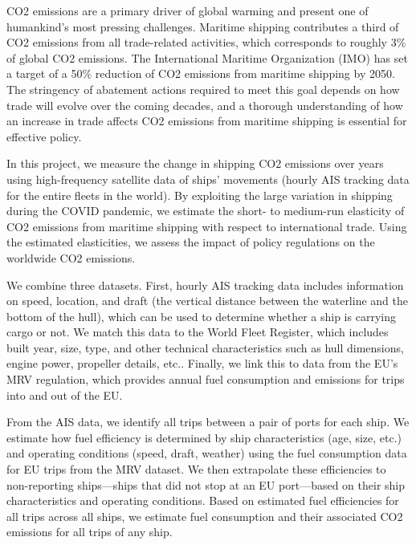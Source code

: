 \documentclass[hidelinks, 12pt,letterpaper]{article}
\begin{document}

 
CO2 emissions are a primary driver of global warming and present one of humankind's most pressing challenges. Maritime shipping contributes a third of CO2 emissions from all trade-related activities, which corresponds to roughly 3\% of global CO2 emissions. The International Maritime Organization (IMO) has set a target of a 50\% reduction of CO2 emissions from maritime shipping by 2050. The stringency of abatement actions required to meet this goal depends on how trade will evolve over the coming decades, and a thorough understanding of how an increase in trade affects CO2 emissions from maritime shipping is essential for effective policy. 

In this project, we measure the change in shipping CO2 emissions over years using high-frequency satellite data of ships’ movements (hourly AIS tracking data for the entire fleets in the world). By exploiting the large variation in shipping during the COVID pandemic, we estimate the short- to medium-run elasticity of CO2 emissions from maritime shipping with respect to international trade. Using the estimated elasticities, we assess the impact of policy regulations on the worldwide CO2 emissions. 

We combine three datasets. First, hourly AIS tracking data includes information on speed, location, and draft (the vertical distance between the waterline and the bottom of the hull), which can be used to determine whether a ship is carrying cargo or not. We match this data to the World Fleet Register, which includes built year, size, type, and other technical characteristics such as hull dimensions, engine power, propeller details, etc.. Finally, we link this to data from the EU’s MRV regulation, which provides annual fuel consumption and emissions for trips into and out of the EU.  

From the AIS data, we identify all trips between a pair of ports for each ship. We estimate how fuel efficiency is determined by ship characteristics (age, size, etc.) and operating conditions (speed, draft, weather) using the fuel consumption data for EU trips from the MRV dataset. We then extrapolate these efficiencies to non-reporting ships—ships that did not stop at an EU port—based on their ship characteristics and operating conditions. Based on estimated fuel efficiencies for all trips across all ships, we estimate fuel consumption and their associated CO2 emissions for all trips of any ship. 
\end{document}
